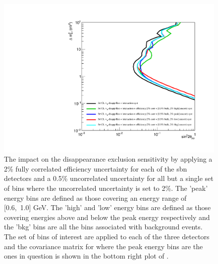 \begin{figure}[!h]
    \centering
    \includegraphics[width = \largefigwidth]{figures-chap6/exclusion_contours/efficiency_systematics/numu_disapp_2pct_cor_05pct_bulk_2pct_X_uncor.pdf}
    \caption[\numu disappearance with poorly constrained efficiency systematic for a set of bins.]{The impact on the \numu disappearance exclusion sensitivity by applying a 2\% fully correlated efficiency uncertainty for each of the \gls{sbn} detectors and a 0.5\% uncorrelated uncertainty for all but a single set of bins where the uncorrelated uncertainty is set to 2\%. The 'peak' energy bins are defined as those covering an energy range of [0.6,~1.0] GeV. The 'high' and 'low' energy bins are defined as those covering energies above and below the peak energy respectively and the 'bkg' bins are all the bins associated with background events. The set of bins of interest are applied to each of the three detectors and the covariance matrix for where the peak energy bins are the ones in question is shown in the bottom right plot of .}
    \label{fig:numu_bulk_uncorr}
\end{figure}







%
